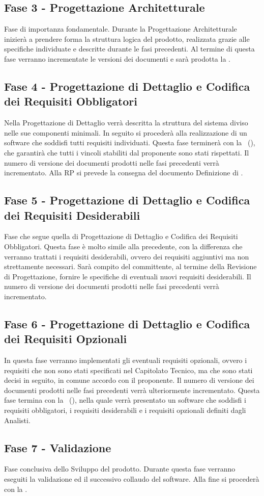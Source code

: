 \documentclass[../PianoDiProgetto.tex]{subfiles}
\begin{document}
	\subsection{Fase 3 - Progettazione Architetturale}
	Fase di importanza fondamentale. Durante la Progettazione Architetturale inizierà a prendere forma la struttura logica del prodotto, realizzata grazie alle specifiche individuate e descritte durante le fasi precedenti. Al termine di questa fase verranno incrementate le versioni dei documenti e sarà prodotta la .
		
	\subsection{Fase 4 - Progettazione di Dettaglio e Codifica dei Requisiti Obbligatori}
	Nella Progettazione di Dettaglio verrà descritta la struttura del sistema diviso nelle sue componenti minimali. In seguito si procederà alla realizzazione di un software che soddisfi tutti requisiti individuati. Questa fase terminerà con la \revisionediprogettazione\ (), che garantirà che tutti i vincoli stabiliti dal proponente sono stati rispettati. Il numero di versione dei documenti prodotti nelle fasi precedenti verrà incrementato. Alla RP si prevede la consegna del documento Definizione di  .
		
	\subsection{Fase 5 - Progettazione di Dettaglio e Codifica dei Requisiti Desiderabili}
	Fase che segue quella di Progettazione di Dettaglio e Codifica dei Requisiti Obbligatori. Questa fase è molto simile alla precedente, con la differenza che verranno trattati i requisiti desiderabili, ovvero dei requisiti aggiuntivi ma non strettamente necessari. Sarà compito del committente, al termine della Revisione di Progettazione, fornire le specifiche di eventuali nuovi requisiti desiderabili. Il numero di versione dei documenti prodotti nelle fasi precedenti verrà incrementato.
		
	\subsection{Fase 6 - Progettazione di Dettaglio e Codifica dei Requisiti Opzionali}
	In questa fase verranno implementati gli eventuali requisiti opzionali, ovvero i requisiti che non sono stati specificati nel Capitolato Tecnico, ma che sono stati decisi in seguito, in comune accordo con il proponente. Il numero di versione dei documenti prodotti nelle fasi precedenti verrà ulteriormente incrementato. Questa fase termina con la \revisionediqualifica\ (), nella quale verrà presentato un software che soddisfi i requisiti obbligatori, i requisiti desiderabili e i requisiti opzionali definiti dagli Analisti.
		
	\subsection{Fase 7 - Validazione}
	Fase conclusiva dello Sviluppo del prodotto. Durante questa fase verranno eseguiti la validazione ed il successivo collaudo del software. Alla fine si procederà con la \revisionediaccettazione. \\
\end{document}
